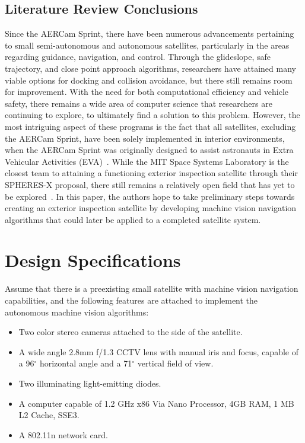 \documentclass[journal, 10pt]{IEEEtran}
\begin{document}
\subsection{Literature Review Conclusions}
Since the AERCam Sprint, there have been numerous advancements pertaining to small semi-autonomous and autonomous satellites, particularly in the areas regarding guidance, navigation, and control. Through the glideslope, safe trajectory, and close point approach algorithms, researchers have attained many viable options for docking and collision avoidance, but there still remains room for improvement. With the need for both computational efficiency and vehicle safety, there remains a wide area of computer science that researchers are continuing to explore, to ultimately find a solution to this problem. However, the most intriguing aspect of these programs is the fact that all satellites, excluding the AERCam Sprint, have been solely implemented in interior environments, when the AERCam Sprint was originally designed to assist astronauts in Extra Vehicular Activities (EVA)~\cite{Aercam, MiniAercam}. While the MIT Space Systems Laboratory is the closest team to attaining a functioning exterior inspection satellite through their SPHERES-X proposal, there still remains a relatively open field that has yet to be explored~\cite{SPHERES}. In this paper, the authors hope to take preliminary steps towards creating an exterior inspection satellite by developing machine vision navigation algorithms that could later be applied to a completed satellite system.

\section{Design Specifications}
Assume that there is a preexisting small satellite with machine vision navigation capabilities, and the following features are attached to implement the autonomous machine vision algorithms:
\begin{itemize}
\item Two color stereo cameras attached to the side of the satellite.
\item A wide angle 2.8mm f/1.3 CCTV lens with manual iris and focus, capable of a 96$^{\circ}$ horizontal angle and a 71$^{\circ}$ vertical field of view.
\item Two illuminating light-emitting diodes.
\item A computer capable of 1.2 GHz x86 Via Nano Processor, 4GB RAM, 1 MB L2 Cache, SSE3.
\item A 802.11n network card.
\end{itemize}
\cite{Vertigo2, Vertigo3, virt_sim, lens}
\end{document}
